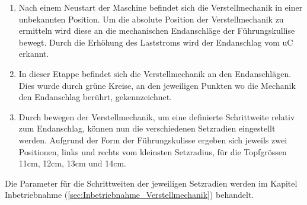 \begin{enumerate}
	\item Nach einem Neustart der Maschine befindet sich die Verstellmechanik in einer unbekannten Position. Um die absolute Position der Verstellmechanik zu ermitteln wird diese an die mechanischen Endanschläge der Führungskullise bewegt. Durch die Erhöhung des Laststroms wird der Endanschlag vom uC erkannt.
	\item In dieser Etappe befindet sich die Verstellmechanik an den Endanschlägen. Dies wurde durch grüne Kreise, an den jeweiligen Punkten wo die Mechanik den Endanschlag berührt, gekennzeichnet.
	\item Durch bewegen der Verstellmechanik, um eine definierte Schrittweite relativ zum Endanschlag, können nun die verschiedenen Setzradien eingestellt werden. Aufgrund der Form der Führungskulisse ergeben sich jeweils zwei Positionen, links und rechts vom kleinsten Setzradius, für die Topfgrössen 11cm, 12cm, 13cm und 14cm.
\end{enumerate}

Die Parameter für die Schrittweiten der jeweiligen Setzradien werden im Kapitel Inbetriebnahme (\ref{sec:Inbetriebnahme_Verstellmechanik}) behandelt.